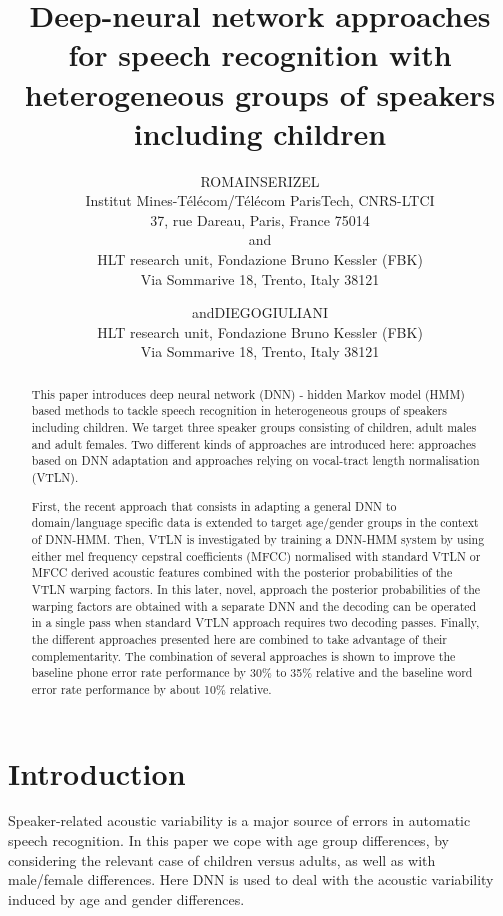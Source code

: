 \documentclass{nle}
\title[DNN approaches for ASR with heterogeneous groups of speakers]{Deep-neural network approaches for speech recognition with heterogeneous groups of speakers including children}
\author[Romain Serizel and Diego Giuliani]{R\ls O\ls M\ls A\ls I\ls N\ns S\ls E\ls R\ls I\ls Z\ls E\ls L\\
Institut Mines-Télécom/Télécom ParisTech, CNRS-LTCI\\
37, rue Dareau, Paris, France 75014\\
and \\
HLT research unit, Fondazione Bruno Kessler (FBK)\\
Via Sommarive 18, Trento, Italy 38121
\and
and\ns D\ls I\ls E\ls G\ls O\ns G\ls I\ls U\ls L\ls I\ls A\ls N\ls I\\
HLT research unit, Fondazione Bruno Kessler (FBK)\\
Via Sommarive 18, Trento, Italy 38121}
\begin{document}
\label{firstpage}
\maketitle
\doublespacing
\begin{abstract} %
This paper introduces deep neural network  (DNN) -  hidden  Markov model (HMM) based methods to tackle speech recognition in heterogeneous groups of speakers including children. We target three speaker groups consisting of children, adult males and adult females. Two different kinds of approaches are introduced here: approaches based on DNN adaptation and approaches relying on vocal-tract length normalisation (VTLN).

First, the recent approach that consists
in adapting a general DNN to domain/language specific data is extended
to target  age/gender groups  in the context  of DNN-HMM. Then, VTLN is investigated by training a DNN-HMM system by using either mel frequency cepstral coefficients (MFCC) normalised with standard VTLN or MFCC derived acoustic features combined with the posterior probabilities of the VTLN warping factors. In this later, novel, approach the posterior probabilities of the warping factors are obtained with a separate DNN and the decoding can be operated in a single pass when standard VTLN approach requires two decoding passes. Finally, the different approaches presented here are combined to take advantage of their complementarity. The combination of several approaches is shown to improve the baseline phone error rate performance by 30\% to 35\% relative and the baseline word error rate performance by about 10\% relative. 

\end{abstract}

\section{Introduction}
Speaker-related  acoustic variability is a major  source of
errors in automatic  speech recognition.  In this  paper we cope
with  age  group differences,  by  considering  the  relevant case  of
children versus adults, as well as with male/female differences. 
Here DNN is used to deal with the acoustic variability induced by  age and gender differences.
\end{document}
